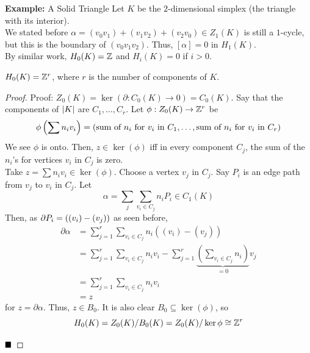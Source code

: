 \begin{example}{\textbf{Example:} A Solid Triangle}
    Let $K$ be the $2$-dimensional simplex (the triangle with its interior).\\


    We stated before $\alpha = (v_0v_1) + (v_1v_2) + (v_2v_0) \in Z_1(K)$ is still a $1$-cycle, but this is the boundary of $(v_0v_1v_2)$. Thus, $[\alpha] = 0$ in $H_1(K)$.\\

    By similar work, $H_0(K) = \Z$ and $H_i(K) = 0$ if $i > 0$.
\end{example}

\begin{theorem}
    $H_0(K) = \Z^{r}$, where $r$ is the number of components of $K$.
\end{theorem}
\begin{proof}{Proof:}
    $Z_0(K) = \ker(\partial : C_0(K) \to 0) = C_0(K)$. Say that the components of $\abs{K}$ are $C_1, \ldots, C_r$.
    Let $\phi : Z_0(K) \to \Z^{r}$ be
    \[ \phi\left(\sum n_iv_i\right) = (\tt{sum of } n_i \tt{ for } v_i \tt{ in } C_1, \ldots, \tt{sum of } n_i \tt{ for } v_i \tt{ in } C_r) \]
    We see $\phi$ is onto. Then, $z \in \ker(\phi)$ iff in every component $C_j$, the sum of the $n_i$'s for vertices $v_i$ in $C_j$ is zero.\\


    Take $z = \sum n_iv_i \in \ker(\phi)$. Choose a vertex $v_j$ in $C_j$. Say $P_i$ is an edge path from $v_j$ to $v_i$ in $C_j$. Let
    \[ \alpha = \sum_{j}\sum_{v_i \in C_j} n_iP_i \in C_1(K) \]
    Then, as $\del P_i = ((v_i) - (v_j))$ as seen before,
    \begin{align*}
        \partial\alpha &= \sum_{j = 1}^{r}\sum_{v_i \in C_j} n_i((v_i) - (v_j))\\
        &= \sum_{j = 1}^{r}\sum_{v_i \in C_j} n_iv_i - \sum_{j = 1}^{r}\underbrace{\left(\sum_{v_i \in C_j} n_i\right)}_{= 0}v_j\\
        &= \sum_{j = 1}^{r}\sum_{v_i \in C_j} n_iv_i\\
        &= z
    \end{align*}
    for $z = \partial\alpha$. Thus, $z \in B_0$. It is also clear $B_0 \subseteq \ker(\phi)$, so
    \[ H_0(K) = Z_0(K)/B_0(K) = Z_0(K)/\ker\phi \cong \Z^{r} \]

    $\qed$
\end{proof}
